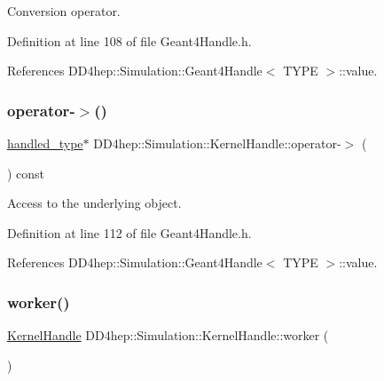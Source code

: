 Conversion operator. 



Definition at line 108 of file Geant4\+Handle.\+h.



References D\+D4hep\+::\+Simulation\+::\+Geant4\+Handle$<$ T\+Y\+P\+E $>$\+::value.

\hypertarget{class_d_d4hep_1_1_simulation_1_1_kernel_handle_a8d1f7c22169c2cfd0148827213a9071d}{}\label{class_d_d4hep_1_1_simulation_1_1_kernel_handle_a8d1f7c22169c2cfd0148827213a9071d} 
\subsubsection{\texorpdfstring{operator-\/$>$()}{operator->()}}
{\footnotesize\ttfamily \hyperlink{class_d_d4hep_1_1_simulation_1_1_kernel_handle_ab3846addea4978dab36bdb0cfb53dc34}{handled\+\_\+type}$\ast$ D\+D4hep\+::\+Simulation\+::\+Kernel\+Handle\+::operator-\/$>$ (\begin{DoxyParamCaption}{ }\end{DoxyParamCaption}) const\hspace{0.3cm}{\ttfamily [inline]}}



Access to the underlying object. 



Definition at line 112 of file Geant4\+Handle.\+h.



References D\+D4hep\+::\+Simulation\+::\+Geant4\+Handle$<$ T\+Y\+P\+E $>$\+::value.

\hypertarget{class_d_d4hep_1_1_simulation_1_1_kernel_handle_a456dfc14c139dfc0e7dc06e0d891fd15}{}\label{class_d_d4hep_1_1_simulation_1_1_kernel_handle_a456dfc14c139dfc0e7dc06e0d891fd15} 
\subsubsection{\texorpdfstring{worker()}{worker()}}
{\footnotesize\ttfamily \hyperlink{class_d_d4hep_1_1_simulation_1_1_kernel_handle}{Kernel\+Handle} D\+D4hep\+::\+Simulation\+::\+Kernel\+Handle\+::worker (\begin{DoxyParamCaption}{ }\end{DoxyParamCaption})}



